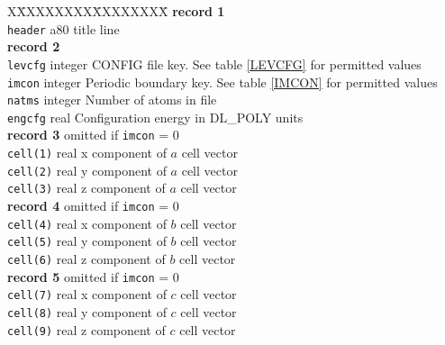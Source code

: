 \begin{tabbing}
X\=XXXXXXXX\=XXXXXXXX\=\kill
{\bf record 1}\\
\> {\tt header} \> a80 \> title line\\
{\bf record 2}\\
\> {\tt levcfg} \> integer \> CONFIG file key. See table \ref{LEVCFG}
for permitted values\\
\> {\tt imcon} \> integer \> Periodic boundary key. See table
\ref{IMCON} for permitted values\\
\> {\tt natms} \> integer \> Number of atoms in file \\
\> {\tt engcfg} \> real \> Configuration energy in DL\_POLY units\\
{\bf record 3} \> \> omitted if {\tt imcon} = 0\\
\> {\tt cell(1)}\> real \> x component of $a$ cell vector\\
\> {\tt cell(2)}\> real \> y component of $a$ cell vector\\
\> {\tt cell(3)}\> real \> z component of $a$ cell vector\\
{\bf record 4} \> \> omitted if {\tt imcon} = 0\\
\> {\tt cell(4)}\> real \> x component of $b$ cell vector\\
\> {\tt cell(5)}\> real \> y component of $b$ cell vector\\
\> {\tt cell(6)}\> real \> z component of $b$ cell vector\\
{\bf record 5} \> \> omitted if {\tt imcon} = 0\\
\> {\tt cell(7)}\> real \> x component of $c$ cell vector\\
\> {\tt cell(8)}\> real \> y component of $c$ cell vector\\
\> {\tt cell(9)}\> real \> z component of $c$ cell vector\\
\end{tabbing}

